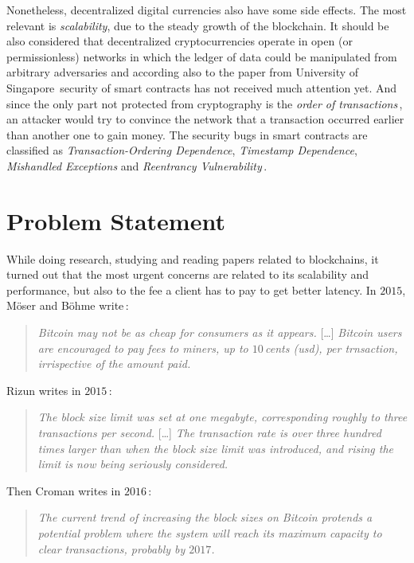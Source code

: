 \documentclass[USenglish]{uit-thesis}
\begin{document}
Nonetheless, decentralized digital currencies also have some side effects.
The most relevant is \emph{scalability}, due to the steady growth of the
blockchain. It should be also considered that
decentralized cryptocurrencies operate in open (or permissionless) networks
in which the ledger of data could be manipulated from arbitrary adversaries and
according also to the paper from University of Singapore\,\cite{Luu:2016}
security of smart contracts has not received much attention yet. And since the
only part not protected from cryptography is the \emph{order of transactions}\,\cite{ethereum_white_paper},
an attacker would try to convince the network that a transaction
occurred earlier than another one to gain money.
The security bugs in smart contracts are classified as \emph{Transaction-Ordering Dependence},
\emph{Timestamp Dependence}, \emph{Mishandled Exceptions}
and \emph{Reentrancy Vulnerability}\,\cite{Luu:2016}.

\section{Problem Statement}
\label{sec:probdefinition}

While doing research, studying and reading papers related to blockchains,
it turned out that the most urgent concerns are related to
its scalability and performance, but also to the fee
a client has to pay to get better latency.
In $2015$, Möser and Böhme write\,\cite{Moser2015}:
\begin{quote}
	\emph{Bitcoin may not be as cheap for consumers as it appears.}
	[\dots]
	\emph{Bitcoin users are encouraged to pay fees to miners, up
	to $10$\,cents (\gls{usd}), per trnsaction, irrispective of the amount
paid.}
\end{quote}

Rizun writes in $2015$\,\cite{Rizun:2015:blocksizelimit}:
\begin{quote}
	\emph{The block size limit was set at one megabyte, corresponding
		roughly to three transactions per second.}
		[\dots]
		\emph{The transaction rate is over three hundred times larger
		than when the block size limit was introduced, and rising the limit
		is now being seriously considered.}
\end{quote}
Then Croman writes in $2016$\,\cite{croman2016}:
\begin{quote}
\emph{The current trend of increasing the block sizes on Bitcoin protends
a potential problem where the system will reach its maximum capacity to clear
transactions, probably by $2017$.}
\end{quote}
\end{document}

